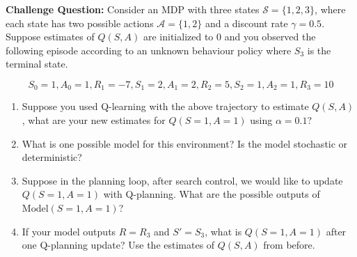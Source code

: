 \textbf{Challenge Question:} Consider an MDP with three states $\mathcal{S} = \{1,2,3 \}$, where each state has two possible actions $\mathcal{A} =\{1, 2\}$ and a discount rate $\gamma = 0.5$.
Suppose estimates of $Q(S,A)$ are initialized to 0 and you observed the 
following episode according to an unknown behaviour policy where $S_3$ is the
terminal state.

\[
	S_0 = 1, A_0 = 1, R_1 = -7, S_1 = 2, A_1= 2, R_2 = 5, S_2 = 1, A_2=1, R_3 = 10
\]
\begin{enumerate}

\item Suppose you used Q-learning with the above trajectory to estimate $Q(S,A)$, what are your new estimates for $Q(S = 1,A = 1)$ using $\alpha=0.1$?
\item What is one possible model for this environment? Is the model stochastic or deterministic?
  \item Suppose in the planning loop, after search control, we would like to update $Q(S=1,A=1)$ with Q-planning.
    What are the possible outputs of $\text{Model}(S = 1, A = 1)$?
  \item If your model outputs $R=R_3$ and $S'= S_3$, what is $Q(S=1, A=1)$ after one Q-planning update?
    Use the estimates of $Q(S,A)$ from before.
\end{enumerate}

